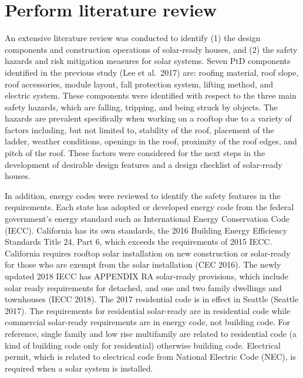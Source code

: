\documentclass[]{article}
\begin{document}
\hypertarget{perform-literature-review}{%
\section{Perform literature review}\label{perform-literature-review}}

An extensive literature review was conducted to identify (1) the design
components and construction operations of solar-ready houses, and (2)
the safety hazards and risk mitigation measures for solar systems. Seven
PtD components identified in the previous study (Lee et al.~2017) are:
roofing material, roof slope, roof accessories, module layout, fall
protection system, lifting method, and electric system. These components
were identified with respect to the three main safety hazards, which are
falling, tripping, and being struck by objects. The hazards are
prevalent specifically when working on a rooftop due to a variety of
factors including, but not limited to, stability of the roof, placement
of the ladder, weather conditions, openings in the roof, proximity of
the roof edges, and pitch of the roof. These factors were considered for
the next steps in the development of desirable design features and a
design checklist of solar-ready houses.

In addition, energy codes were reviewed to identify the safety features
in the requirements. Each state has adopted or developed energy code
from the federal government's energy standard such as International
Energy Conservation Code (IECC). California has its own standards, the
2016 Building Energy Efficiency Standards Title 24, Part 6, which
exceeds the requirements of 2015 IECC. California requires rooftop solar
installation on new construction or solar-ready for those who are exempt
from the solar installation (CEC 2016). The newly updated 2018 IECC has
APPENDIX RA solar-ready provisions, which include solar ready
requirements for detached, and one and two family dwellings and
townhouses (IECC 2018). The 2017 residential code is in effect in
Seattle (Seattle 2017). The requirements for residential solar-ready are
in residential code while commercial solar-ready requirements are in
energy code, not building code. For reference, single family and low
rise multifamily are related to residential code (a kind of building
code only for residential) otherwise building code. Electrical permit,
which is related to electrical code from National Electric Code (NEC),
is required when a solar system is installed.
\end{document}
